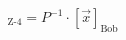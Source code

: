 \documentclass[preview]{standalone}
\begin{document}
\begin{align*}
[\vec{x}]_{\text{Z-4}} = P^{-1} \cdot [\vec{x}]_{\text{Bob}}
\end{align*}
\end{document}
